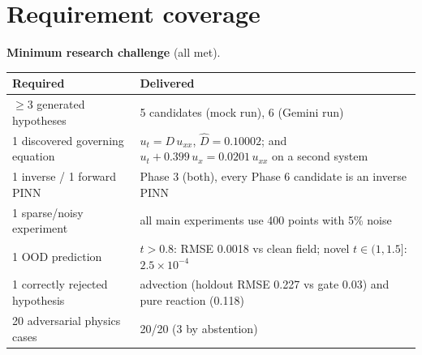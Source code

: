 \documentclass[11pt,a4paper]{article}
\begin{document}
\section{Requirement coverage}

\textbf{Minimum research challenge} (all met).
\begin{center}
\small
\begin{tabular}{@{}L{4.6cm}L{10.6cm}@{}}
\toprule
\textbf{Required} & \textbf{Delivered} \\ \midrule
$\ge$3 generated hypotheses & 5 candidates (mock run), 6 (Gemini run) \\
1 discovered governing equation & $u_t = D\,u_{xx}$, $\hat D = 0.10002$; and $u_t + 0.399\,u_x = 0.0201\,u_{xx}$ on a second system \\
1 inverse / 1 forward PINN & Phase 3 (both), every Phase 6 candidate is an inverse PINN \\
1 sparse/noisy experiment & all main experiments use 400 points with 5\% noise \\
1 OOD prediction & $t>0.8$: RMSE 0.0018 vs clean field; novel $t\in(1,1.5]$: $2.5\times10^{-4}$ \\
1 correctly rejected hypothesis & advection (holdout RMSE 0.227 vs gate 0.03) and pure reaction (0.118) \\
20 adversarial physics cases & 20/20 (3 by abstention) \\
\bottomrule
\end{tabular}
\end{center}
\end{document}
